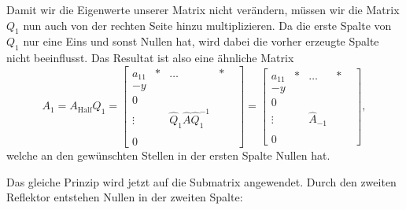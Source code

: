 Damit wir die Eigenwerte unserer Matrix nicht verändern, müssen wir die Matrix $Q_1$ nun auch von der rechten Seite hinzu multiplizieren.
Da die erste Spalte von $Q_1$ nur eine Eins und sonst Nullen hat, wird dabei die vorher erzeugte Spalte nicht beeinflusst.
Das Resultat ist also eine ähnliche Matrix
\begin{equation}
	A_{1}=A_{\text{Half}}Q_{1}=
	\begin{bmatrix}
	a_{11} & * & \dots & *\\
	-y & \\
	0 & & & &\\
	\vdots & &\hat{Q}_1\hat{A}\hat{Q}_1^{-1} &\\
	 & & & &\\
	0 & & & &
	\end{bmatrix}
	=
	\begin{bmatrix}
	a_{11} & * & \dots & *\\
	-y & \\
	0 & & & &\\
	\vdots & &\hat{A}_{-1} &\\
	 & & & &\\
	0 & & & &
	\end{bmatrix},
\end{equation}	
welche an den gewünschten Stellen in der ersten Spalte Nullen hat.

Das gleiche Prinzip wird jetzt auf die Submatrix angewendet.
Durch den zweiten Reflektor entstehen Nullen in der zweiten Spalte:

